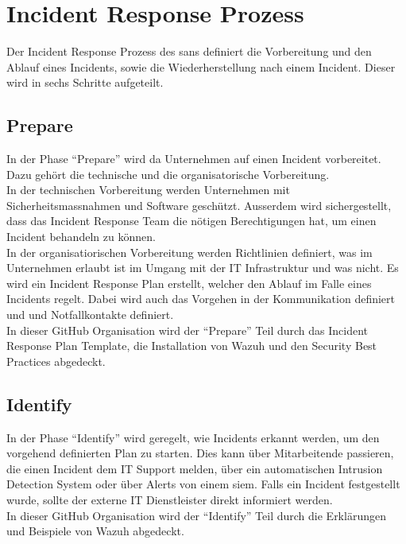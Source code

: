 \section{Incident Response Prozess}
Der Incident Response Prozess des \acrfull{sans} definiert die Vorbereitung und den Ablauf eines Incidents, sowie die Wiederherstellung nach einem Incident.
Dieser wird in sechs Schritte aufgeteilt. 

\subsection{Prepare}
In der Phase ``Prepare'' wird da Unternehmen auf einen Incident vorbereitet. 
Dazu gehört die technische und die organisatorische Vorbereitung.\\

In der technischen Vorbereitung werden Unternehmen mit Sicherheitsmassnahmen und Software geschützt.
Ausserdem wird sichergestellt, dass das Incident Response Team die nötigen Berechtigungen hat, um einen Incident behandeln zu können.\\

In der organisatiorischen Vorbereitung werden Richtlinien definiert, was im Unternehmen erlaubt ist im Umgang mit der IT Infrastruktur und was nicht.
Es wird ein Incident Response Plan erstellt, welcher den Ablauf im Falle eines Incidents regelt.
Dabei wird auch das Vorgehen in der Kommunikation definiert und und Notfallkontakte definiert.\\

In dieser GitHub Organisation wird der ``Prepare'' Teil durch das Incident Response Plan Template, die Installation von Wazuh und den Security Best Practices abgedeckt.

\subsection{Identify}
In der Phase ``Identify'' wird geregelt, wie Incidents erkannt werden, um den vorgehend definierten Plan zu starten.
Dies kann über Mitarbeitende passieren, die einen Incident dem IT Support melden, über ein automatischen Intrusion Detection System oder über Alerts von einem \acrshort{siem}.
Falls ein Incident festgestellt wurde, sollte der externe IT Dienstleister direkt informiert werden.\\

In dieser GitHub Organisation wird der ``Identify'' Teil durch die Erklärungen und Beispiele von Wazuh abgedeckt.

